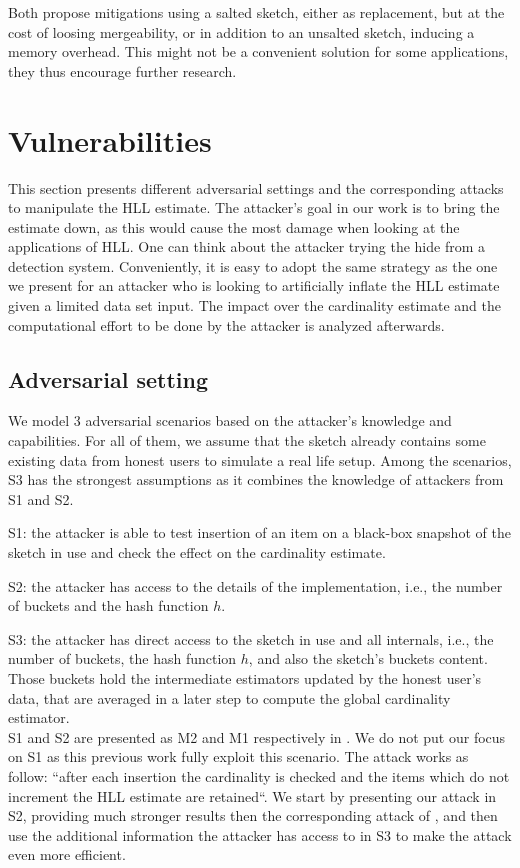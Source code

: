 \documentclass{IEEEtran}
\begin{document}
Both propose mitigations using a salted sketch, either as replacement, but at the cost of loosing mergeability, or in addition to an unsalted sketch, inducing a memory overhead. This might not be a convenient solution for some applications, they thus encourage further research. 

\section{Vulnerabilities}\label{sec:attacks}
This section presents different adversarial settings and the corresponding attacks to manipulate the HLL estimate. The attacker's goal in our work is to bring the estimate down, as this would cause the most damage when looking at the applications of HLL. One can think about the attacker trying the hide from a detection system. Conveniently, it is easy to adopt the same strategy as the one we present for an attacker who is looking to artificially inflate the HLL estimate given a limited data set input. The impact over the cardinality estimate and the computational effort to be done by the attacker is analyzed afterwards. 

\subsection{Adversarial setting}
We model 3 adversarial scenarios based on the attacker's knowledge and capabilities. For all of them, we assume that the sketch already contains some existing data from honest users to simulate a real life setup. Among the scenarios, S3 has the strongest assumptions as it combines the knowledge of attackers from S1 and S2.

S1: the attacker is able to test insertion of an item on a black-box snapshot of the sketch in use and check the effect on the cardinality estimate.

S2: the attacker has access to the details of the implementation, i.e., the number of buckets and the hash function $h$.

S3: the attacker has direct access to the sketch in use and all internals, i.e., the number of buckets, the hash function $h$, and also the sketch's buckets content. Those buckets hold the intermediate estimators updated by the honest user's data, that are averaged in a later step to compute the global cardinality estimator.\\

S1 and S2 are presented as M2 and M1 respectively in \cite{hllvuln}. We do not put our focus on S1 as this previous work fully exploit this scenario. The attack works as follow: ``after each insertion the cardinality is checked and the items which do not increment the HLL estimate are retained``. We start by presenting our attack in S2, providing much stronger results then the corresponding attack of \cite{hllvuln}, and then use the additional information the attacker has access to in S3 to make the attack even more efficient. 
\end{document}
